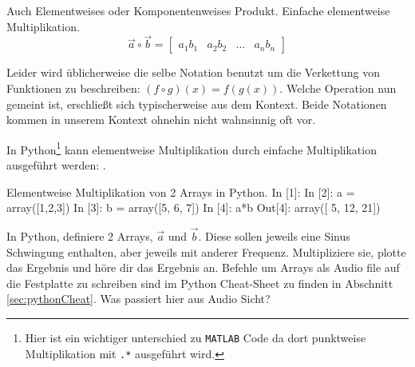 Auch Elementweises oder Komponentenweises Produkt. Einfache elementweise Multiplikation.
$$ \vec{a}\circ \vec{b} = \begin{bmatrix}a_1b_1 & a_2b_2 & \dots & a_n b_n\end{bmatrix}$$ 

Leider wird üblicherweise die selbe Notation benutzt um die Verkettung von Funktionen zu beschreiben: $(f \circ g)(x) = f(g(x))$. Welche Operation nun gemeint ist, erschließt sich typischerweise aus dem Kontext. Beide Notationen kommen in unserem Kontext ohnehin nicht wahnsinnig oft vor.

In Python\footnote{Hier ist ein wichtiger unterschied zu \texttt{MATLAB} Code da dort punktweise Multiplikation mit \texttt{.*} ausgeführt wird.} kann elementweise Multiplikation durch einfache Multiplikation ausgeführt werden: .

\begin{python}{Elementweise Multiplikation von 2 Arrays in Python.}
In [1]: %
In [2]: a = array([1,2,3])
In [3]: b = array([5, 6, 7])
In [4]: a*b
Out[4]: array([ 5, 12, 21])
\end{python}

\begin{question}
In Python, definiere 2 Arrays, $\vec{a}$ und $\vec{b}$. Diese sollen jeweils eine Sinus Schwingung enthalten, aber jeweils mit anderer Frequenz. Multipliziere sie, plotte das Ergebnis und höre dir das Ergebnis an. Befehle um Arrays als Audio file auf die Festplatte zu schreiben sind im Python Cheat-Sheet zu finden in Abschnitt \ref{sec:pythonCheat}. Was passiert hier aus Audio Sicht?
\end{question}

